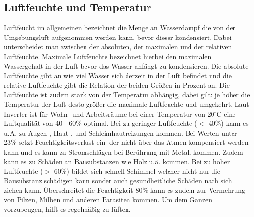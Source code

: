 \documentclass[]{article}
\begin{document}
		\subsection{Luftfeuchte und Temperatur}
			Luftfeucht im allgemeinen bezeichnet die Menge an Wasserdampf die von der Umgebungsluft aufgenommen werden kann, bevor dieser kondensiert. Dabei unterscheidet man zwischen der absoluten, der maximalen und der relativen Luftfeuchte. Maximale Luftfeuchte bezeichnet hierbei den maximalen Wassergehalt in der Luft bevor das Wasser anfängt zu kondensieren. Die absolute Luftfeuchte gibt an wie viel Wasser sich derzeit in der Luft befindet und die relative Luftfeuchte gibt die Relation der beiden Größen in Prozent an. Die Luftfeuchte ist zudem stark von der Temperatur abhängig, dabei gilt: je höher die Temperatur der Luft desto größer die maximale Luftfeuchte und umgekehrt. Laut Inverter\cite{luftquali_inventer} ist für Wohn- und Arbeitsräume bei einer Temperatur von 20$^\circ$C eine Luftqualität von 40 - 60\% optimal. Bei zu geringer Luftfeuchte ($<$ 40\%) kann es u.A. zu Augen-, Haut-, und Schleimhautreizungen kommen. Bei Werten unter 23\% setzt Feuchtigkeitsverlust ein, der nicht über das Atmen kompensiert werden kann und es kann zu Stromschlägen bei Berührung mit Metall kommen. Zudem kann es zu Schäden an Bausubstanzen wie Holz u.ä. kommen. Bei zu hoher Luftfeuchte ($>$ 60\%) bildet sich schnell Schimmel welcher nicht nur die Bausubstanz schädigen kann sonder auch gesundheitliche Schäden nach sich ziehen kann. Überschreitet die Feuchtigkeit 80\% kann es zudem zur Vermehrung von Pilzen, Milben und anderen Parasiten kommen. Um dem Ganzen vorzubeugen, hilft es regelmäßig zu lüften.
\end{document}
